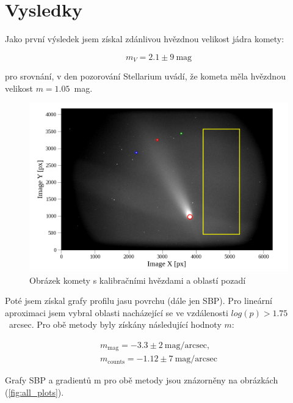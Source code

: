 \documentclass[a4paper,11pt,twocolumn]{article}
\begin{document}
    \section{Vysledky}
        Jako první výsledek jsem získal zdánlivou hvězdnou velikost jádra komety:

        \begin{equation*}
            m_V = 2.1 \pm 9 ~ \text{mag}
        \end{equation*}

        pro srovnání, v den pozorování Stellarium uvádí, že kometa měla hvězdnou velikost $m = 1.05$~mag.

        \begin{figure}
            \centering
            \includegraphics[width=1\textwidth]{comet.png}
            \caption{Obrázek komety s kalibračními hvězdami a oblastí pozadí}
            \label{fig:comet}
        \end{figure}

        Poté jsem získal grafy profilu jasu povrchu (dále jen SBP). Pro lineární aproximaci jsem vybral oblasti nacházející se ve vzdálenosti $log(p) > 1.75$~arcsec. Pro obě metody byly získány následující hodnoty $m$:

        \begin{equation*}
            \begin{split}
                m_{\text{mag}} = -3.3 \pm 2 ~ \text{mag/arcsec}, \\
                m_{\text{counts}} = -1.12 \pm 7 ~ \text{mag/arcsec}
            \end{split}
        \end{equation*}

        Grafy SBP a gradientů m pro obě metody jsou znázorněny na obrázkách (\ref{fig:all_plots}).
\end{document}
